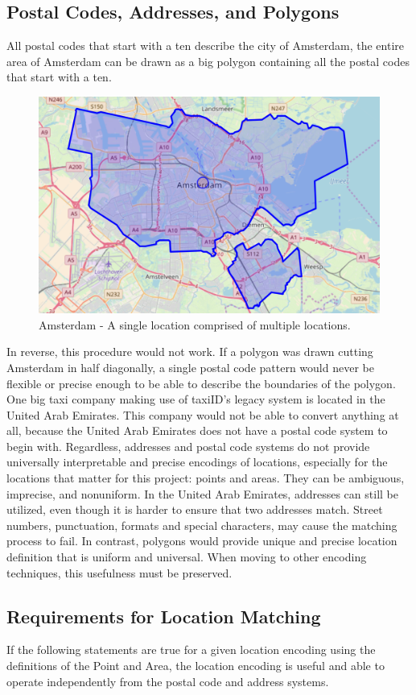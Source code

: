 \subsection{Postal Codes, Addresses, and Polygons}
All postal codes that start with a ten describe the city of Amsterdam, the entire area of Amsterdam can be drawn as a big polygon containing all the postal codes that start with a ten.

\begin{figure}[H]
	\centering
	\includegraphics[width=.8\textwidth]{Amsterdam}
	\caption[Amsterdam]{Amsterdam - A single location comprised of multiple locations.}
	\label{fig:Amsterdam}
\end{figure}

In reverse, this procedure would not work. If a polygon was drawn cutting Amsterdam in half diagonally, a single postal code pattern would never be flexible or precise enough to be able to describe the boundaries of the polygon. One big taxi company making use of taxiID's legacy system is located in the United Arab Emirates. This company would not be able to convert anything at all, because the United Arab Emirates does not have a postal code system to begin with. Regardless, addresses and postal code systems do not provide universally interpretable and precise encodings of locations, especially for the locations that matter for this project: points and areas. They can be ambiguous, imprecise, and nonuniform. In the United Arab Emirates, addresses can still be utilized, even though it is harder to ensure that two addresses match. Street numbers, punctuation, formats and special characters, may cause the matching process to fail. In contrast, polygons would provide unique and precise location definition that is uniform and universal. When moving to other encoding techniques, this usefulness must be preserved.

\subsection{Requirements for Location Matching}
If the following statements are true for a given location encoding using the definitions of the Point and Area, the location encoding is useful and able to operate independently from the postal code and address systems.

